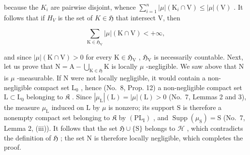 because the \(K_{i}\) are pairwise disjoint, whence \(\sum_{i=1}^{n}| \mu |(\mathrm{K}_{i} \cap \mathrm{V}) \leqslant |\mu |(\mathrm{V})\) . It follows that if \(H_{V}\) is the set of \(K \in \mathfrak{H}\) that intersect V, then

\[
\sum_ {\mathrm{K} \in \mathfrak {H} _ {\mathrm{V}}} | \mu | (\mathrm{K} \cap \mathrm{V}) <   + \infty ,
\]

and since \(|\mu|(\mathrm{K} \cap \mathrm{V}) > 0\) for every \(\mathrm{K} \in \mathfrak{H}_{\mathrm{V}}\) , \(\mathfrak{H}_{\mathrm{V}}\) is necessarily countable. Next, let us prove that \(\mathrm{N} = \mathrm{A} - \bigcup_{\mathrm{K} \in \mathfrak{H}} \mathrm{K}\) is locally \(\mu\) -negligible. We saw above that \(\mathrm{N}\) is \(\mu\) -measurable. If \(\mathrm{N}\) were not locally negligible, it would contain a non-negligible compact set \(\mathrm{L}_0\) , hence (No.~8, Prop. 12) a non-negligible compact set \(\mathrm{L} \subset \mathrm{L}_0\) belonging to \(\mathfrak{K}\) . Since \(|\mu_{\mathrm{L}}|(\mathrm{L}) = |\mu|(\mathrm{L}) > 0\) (No.~7, Lemmas 2 and 3), the measure \(\mu_{\mathrm{L}}\) induced on \(\mathrm{L}\) by \(\mu\) is nonzero; its support \(\mathrm{S}\) is therefore a nonempty compact set belonging to \(\mathfrak{K}\) by \((\mathrm{PL}_{\mathrm{I}})\) , and \(\operatorname{Supp}(\mu_{\mathrm{S}}) = \mathrm{S}\) (No.~7, Lemma 2, (iii)). It follows that the set \(\mathfrak{H} \cup \{\mathrm{S}\}\) belongs to \(\mathscr{H}\) , which contradicts the definition of \(\mathfrak{H}\) ; the set \(\mathrm{N}\) is therefore locally negligible, which completes the proof.


